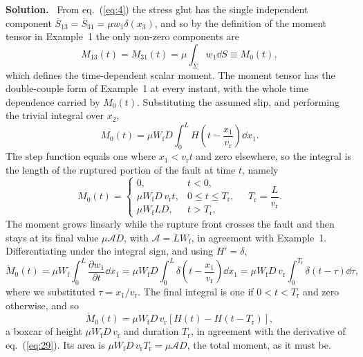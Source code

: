 \documentclass[a4paper,12pt]{paper}
\newenvironment{solution}{\par\noindent\textbf{Solution.}\ }{\par\medskip}
\begin{document}
\begin{solution}
From eq.~(\ref{eq:4}) the stress glut has the single independent component
$\overline{S}_{13}=\overline{S}_{31}=\mu w_{1}\delta(x_{3})$, and so by the definition of
the moment tensor in Example~1 the only non-zero components are
\begin{equation}
M_{13}(t)=M_{31}(t)=\mu\int_{\Sigma}w_{1}\dd S\equiv M_{0}(t),
\label{eq:27}
\end{equation}
which defines the time-dependent scalar moment. The moment tensor has the double-couple
form of Example~1 at every instant, with the whole time dependence carried by
$M_{0}(t)$. Substituting the assumed slip, and performing the trivial integral over
$x_{2}$,
\begin{equation}
M_{0}(t)=\mu W_{\mathrm{f}}D\int_{0}^{L}H\!\left(t-\frac{x_{1}}{v_{\mathrm{r}}}\right)\dd x_{1}.
\label{eq:28}
\end{equation}
The step function equals one where $x_{1}<v_{\mathrm{r}}t$ and zero elsewhere, so the
integral is the length of the ruptured portion of the fault at time $t$, namely
\begin{equation}
M_{0}(t)=\begin{cases}
0, & t<0,\\
\mu W_{\mathrm{f}}D\,v_{\mathrm{r}}t, & 0\le t\le T_{\mathrm{r}},\\
\mu W_{\mathrm{f}}L D, & t>T_{\mathrm{r}},
\end{cases}
\quad T_{\mathrm{r}}=\frac{L}{v_{\mathrm{r}}}.
\label{eq:29}
\end{equation}
The moment grows linearly while the rupture front crosses the fault and then stays at its
final value $\mu\mathcal{A}D$, with $\mathcal{A}=LW_{\mathrm{f}}$, in agreement with
Example~1. Differentiating under the integral sign, and using $H'=\delta$,
\begin{equation}
\dot{M}_{0}(t)=\mu W_{\mathrm{f}}\int_{0}^{L}\frac{\partial w_{1}}{\partial t}\dd x_{1}
=\mu W_{\mathrm{f}}D\int_{0}^{L}\delta\!\left(t-\frac{x_{1}}{v_{\mathrm{r}}}\right)\dd x_{1}
=\mu W_{\mathrm{f}}D\,v_{\mathrm{r}}\int_{0}^{T_{\mathrm{r}}}\delta(t-\tau)\dd\tau,
\label{eq:30}
\end{equation}
where we substituted $\tau=x_{1}/v_{\mathrm{r}}$. The final integral is one if
$0<t<T_{\mathrm{r}}$ and zero otherwise, and so
\begin{equation}
\dot{M}_{0}(t)=\mu W_{\mathrm{f}}D\,v_{\mathrm{r}}\left[H(t)-H(t-T_{\mathrm{r}})\right],
\label{eq:31}
\end{equation}
a boxcar of height $\mu W_{\mathrm{f}}D\,v_{\mathrm{r}}$ and duration $T_{\mathrm{r}}$, in
agreement with the derivative of eq.~(\ref{eq:29}). Its area is
$\mu W_{\mathrm{f}}D\,v_{\mathrm{r}}T_{\mathrm{r}}=\mu\mathcal{A}D$, the total moment, as it
must be.


\end{solution}
\end{document}
